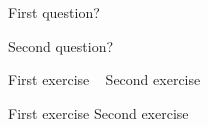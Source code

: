 \begin{activity}
\begin{ctqs}

	\question First question?
		\begin{solution}[1in]
		\end{solution}
	
	\question Second question?
		\begin{solution}[1in]
		\end{solution}
\end{ctqs}



\begin{exercises}

	\exercise First exercise ~
	\exercise Second exercise
	
\end{exercises}


\begin{problems}

	\problem First exercise
	\problem Second exercise
	
\end{problems}


	
\end{activity}